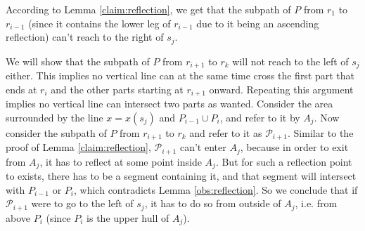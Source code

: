\documentclass[10pt,a4paper]{amsart}
\theoremstyle{thmstyleone}
\begin{document}
	According to Lemma \ref{claim:reflection}, we get that the subpath of $P$ from $r_{1}$ to $r_{i - 1}$ (since it contains the lower leg of $r_{i - 1}$ due to it being an ascending reflection) can't reach to the right of $s_{j}$.      
	
	We will show that the subpath of $P$ from $r_{i + 1}$ to $r_k$ will not reach to the left of $s_j$ either. This implies no vertical line can at the same time cross the first part that ends at $r_i$ and the other parts starting at $r_{i+1}$ onward. Repeating this argument implies no vertical line can intersect two parts as wanted.
        Consider the area surrounded by the line $x = x(s_j)$ and $P_{i - 1}\cup P_{i}$, and refer to it by $A_{j}$. 
        Now consider the subpath of $P$ from $r_{i + 1}$ to $r_{k}$ and refer to it as $\mathcal P_{i + 1}$. Similar to the proof of Lemma \ref{claim:reflection}, $\mathcal P_{i+1}$ can't enter $A_j$, because in order to exit from $A_j$, it has to reflect at some point inside $A_j$. 
        But for such a reflection point to exists, there has to be a segment containing it,
        and that segment will intersect with $P_{i-1}$ or $P_{i}$, 
        which contradicts Lemma \ref{obs:reflection}. 
        So we conclude that if $\mathcal P_{i + 1}$ were to go to the left of $s_{j}$, it has to do so from outside of $A_{j}$, i.e. from above $P_i$ (since $P_i$ is the upper hull of $A_j$).
\end{document}
